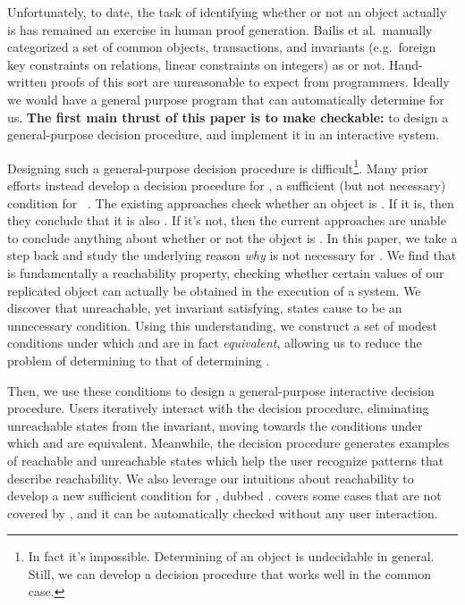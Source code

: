 Unfortunately, to date, the task of identifying whether or not
an object actually is \invariantconfluent{} has remained an exercise in human proof generation. Bailis et al.\
manually categorized a set of common objects, transactions, and invariants
(e.g.\ foreign key constraints on relations, linear constraints on integers) as
\invariantconfluent{} or not. Hand-written proofs of this sort are unreasonable to expect from programmers. Ideally we would have a general purpose
program that can automatically determine \invariantconfluence{} for us.
\textbf{The first main thrust of this paper is to make \invariantconfluence{} checkable:} to design a general-purpose
\invariantconfluence{} decision procedure, and implement it in an interactive system.

Designing such a general-purpose decision procedure is
difficult\footnote{In fact it's impossible. Determining
\invariantconfluence{} of an object is undecidable in general. Still, we can develop a
decision procedure that works well in the common case.}. Many prior
efforts instead develop a decision procedure for \emph{\invariantclosure{}}, a
sufficient (but not necessary) condition for
\invariantconfluence{}~\cite{li2012making, li2014automating}. The existing
approaches check whether an object is \invariantclosed{}. If it is, then they
conclude that it is also \invariantconfluent{}. If it's not, then the current
approaches are unable to conclude anything about whether or not the object is
\invariantconfluent{}. In this paper, we take a step back and study the
underlying reason \emph{why} \invariantclosure{} is not necessary for
\invariantconfluence{}. We find that \invariantconfluence{} is fundamentally a
reachability property, checking whether certain values of our replicated
object can actually be obtained in the execution of a system. We discover that
unreachable, yet invariant satisfying, states cause \invariantclosure{} to be
an unnecessary condition. Using this understanding, we construct a set of
modest conditions under which \invariantclosure{} and \invariantconfluence{}
are in fact \emph{equivalent}, allowing us to reduce the problem of determining
\invariantconfluence{} to that of determining \invariantclosure{}.

Then, we use these conditions to design a general-purpose interactive
\invariantconfluence{} decision procedure. Users iteratively interact with the
decision procedure, eliminating unreachable states from the invariant, moving
towards the conditions under which \invariantclosure{} and
\invariantconfluence{} are equivalent. Meanwhile, the decision procedure
generates examples of reachable and unreachable states which help the user
recognize patterns that describe reachability. We also leverage our intuitions
about reachability to develop a new sufficient condition for
\invariantconfluence{}, dubbed \emph{\mergereducibility}. \Mergereducibility{} covers
some cases that are not covered by \invariantclosure{}, and it can be
automatically checked without any user interaction.

